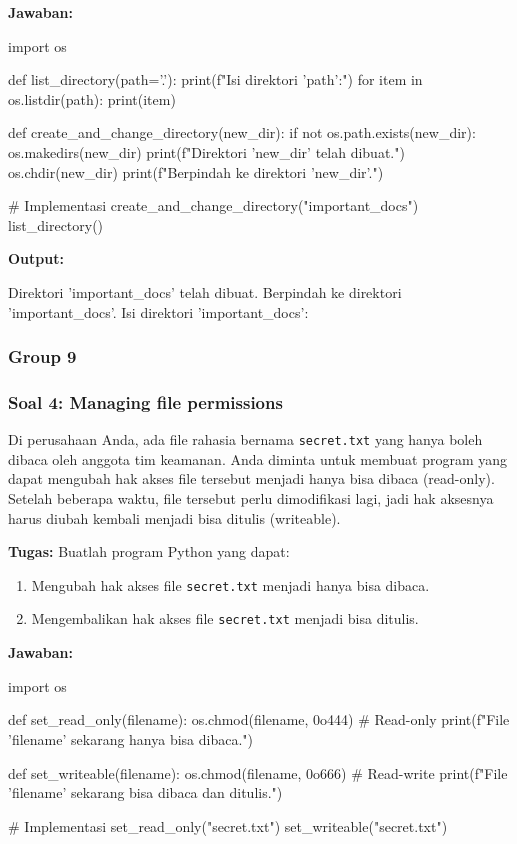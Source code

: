 \documentclass[12pt]{article}
\begin{document}
\textbf{Jawaban:}
\begin{python}
import os

def list_directory(path='.'):
    print(f"Isi direktori '{path}':")
    for item in os.listdir(path):
        print(item)

def create_and_change_directory(new_dir):
    if not os.path.exists(new_dir):
        os.makedirs(new_dir)
        print(f"Direktori '{new_dir}' telah dibuat.")
    os.chdir(new_dir)
    print(f"Berpindah ke direktori '{new_dir}'.")

# Implementasi
create_and_change_directory("important_docs")
list_directory()
\end{python}

\textbf{Output:}
\begin{python}
Direktori 'important_docs' telah dibuat.
Berpindah ke direktori 'important_docs'.
Isi direktori 'important_docs':
\end{python}

\subsubsection{Group 9}
\subsubsection*{Soal 4: Managing file permissions}
Di perusahaan Anda, ada file rahasia bernama \texttt{secret.txt} yang hanya boleh dibaca oleh anggota tim keamanan. Anda diminta untuk membuat program yang dapat mengubah hak akses file tersebut menjadi hanya bisa dibaca (read-only). Setelah beberapa waktu, file tersebut perlu dimodifikasi lagi, jadi hak aksesnya harus diubah kembali menjadi bisa ditulis (writeable).

\textbf{Tugas:} Buatlah program Python yang dapat:
\begin{enumerate}
    \item Mengubah hak akses file \texttt{secret.txt} menjadi hanya bisa dibaca.
    \item Mengembalikan hak akses file \texttt{secret.txt} menjadi bisa ditulis.
\end{enumerate}

\textbf{Jawaban:}
\begin{python}
import os

def set_read_only(filename):
    os.chmod(filename, 0o444)  # Read-only
    print(f"File '{filename}' sekarang hanya bisa dibaca.")

def set_writeable(filename):
    os.chmod(filename, 0o666)  # Read-write
    print(f"File '{filename}' sekarang bisa dibaca dan ditulis.")

# Implementasi
set_read_only("secret.txt")
set_writeable("secret.txt")
\end{python}
\end{document}

